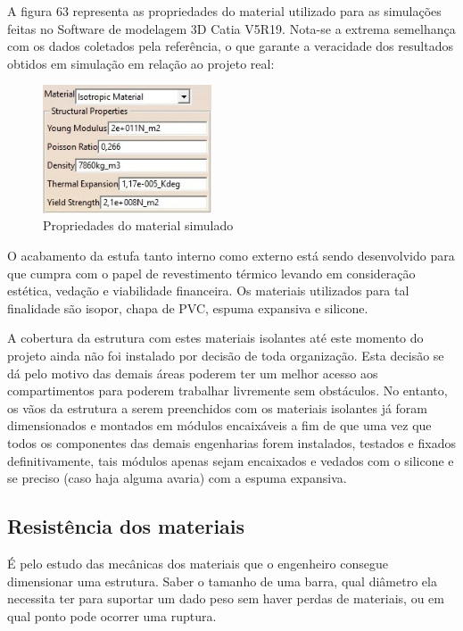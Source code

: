 A figura 63 representa as propriedades do material utilizado para as simulações feitas no Software de modelagem 3D Catia V5R19. Nota-se a extrema semelhança com os dados coletados pela referência, o que garante a veracidade dos resultados obtidos em simulação em relação ao projeto real:

\begin{figure}[H]
	\centering
	\includegraphics[width=5cm]{figuras/propriedade_material.jpg}
	\caption{Propriedades do material simulado} \label{propriedade_material}
\end{figure}

O acabamento da estufa tanto interno como externo está sendo desenvolvido para que cumpra com o papel de revestimento térmico  levando em consideração estética, vedação e viabilidade financeira. Os materiais utilizados para tal finalidade são isopor, chapa de PVC, espuma expansiva e silicone.

A cobertura da estrutura com estes materiais isolantes até este momento do projeto ainda não foi instalado por decisão de toda organização. Esta decisão se dá pelo motivo das demais áreas poderem ter um melhor acesso aos compartimentos para poderem trabalhar livremente sem obstáculos. No entanto, os vãos da estrutura a serem preenchidos com os materiais isolantes já foram dimensionados e montados em módulos encaixáveis a fim de que uma vez que todos os componentes das demais engenharias forem instalados, testados e fixados definitivamente, tais módulos apenas sejam encaixados e vedados com o silicone e se preciso (caso haja alguma avaria) com a espuma expansiva. 

\subsection{Resistência dos materiais}

É pelo estudo das mecânicas dos materiais que o engenheiro consegue dimensionar uma estrutura. Saber o tamanho de uma barra, qual diâmetro ela necessita ter para suportar um dado peso sem haver perdas de materiais, ou em qual ponto pode ocorrer uma ruptura. 

